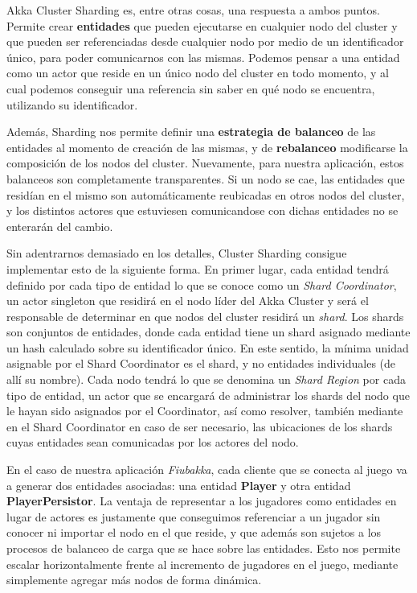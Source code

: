 Akka Cluster Sharding es, entre otras cosas, una respuesta a ambos puntos. Permite crear \textbf{entidades} que pueden ejecutarse en cualquier nodo
del cluster y que pueden ser referenciadas desde cualquier nodo por medio de un identificador único, para poder comunicarnos con las mismas.
Podemos pensar a una entidad como un actor que reside en un único nodo del cluster en todo momento, y al cual podemos conseguir una referencia sin saber
en qué nodo se encuentra, utilizando su identificador.

Además, Sharding nos permite definir una \textbf{estrategia de balanceo} de las entidades al momento de creación de las mismas,
y de \textbf{rebalanceo} modificarse la composición de los nodos del cluster. Nuevamente, para nuestra aplicación, estos balanceos son
completamente transparentes. Si un nodo se cae, las entidades que residían en el mismo son automáticamente reubicadas en otros nodos del cluster,
y los distintos actores que estuviesen comunicandose con dichas entidades no se enterarán del cambio.

Sin adentrarnos demasiado en los detalles, Cluster Sharding consigue implementar esto de la siguiente forma.
En primer lugar, cada entidad tendrá definido por cada tipo de entidad lo que se conoce como un \textit{Shard Coordinator}, un actor singleton
que residirá en el nodo líder del Akka Cluster y será el responsable de determinar en que nodos del cluster residirá
un \textit{shard}. Los shards son conjuntos de entidades, donde cada entidad tiene un shard asignado mediante un hash calculado sobre su
identificador único. En este sentido, la mínima unidad asignable por el Shard Coordinator es el shard, y no entidades individuales (de allí su nombre).
Cada nodo tendrá lo que se denomina un \textit{Shard Region} por cada tipo de entidad, un actor que se encargará de administrar los shards del nodo
que le hayan sido asignados por el Coordinator, así como resolver, también mediante en el Shard Coordinator en caso de ser necesario, las ubicaciones
de los shards cuyas entidades sean comunicadas por los actores del nodo.

En el caso de nuestra aplicación \textit{Fiubakka}, cada cliente que se conecta al juego va a generar dos entidades asociadas: una entidad
\textbf{Player} y otra entidad \textbf{PlayerPersistor}. La ventaja de representar a los jugadores como entidades en lugar de actores es justamente que conseguimos
referenciar a un jugador sin conocer ni importar el nodo en el que reside, y que además son sujetos a los procesos de balanceo de carga que se hace sobre las entidades.
Esto nos permite escalar horizontalmente frente al incremento de jugadores en el juego, mediante simplemente agregar más nodos de forma dinámica.

